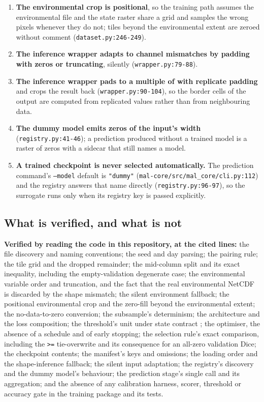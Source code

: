 \documentclass[11pt,a4paper]{article}
\newcommand{\codex}[1]{\texttt{#1}}
\newcommand{\PoolMult}{\codeconst{training.pad_multiple}}
\newcommand{\StateContract}{\mskey{contracts.cogs_state}}
\begin{document}
\begin{enumerate}
\item \textbf{The environmental crop is positional}, so the training path
      assumes the environmental file and the state raster share a grid and
      samples the wrong pixels whenever they do not; tiles beyond the
      environmental extent are zeroed without comment
      (\codex{dataset.py:246-249}).
\item \textbf{The inference wrapper adapts to channel mismatches by padding
      with zeros or truncating}, silently (\codex{wrapper.py:79-88}).
\item \textbf{The inference wrapper pads to a multiple of \PoolMult{} with
      replicate padding} and crops the result back
      (\codex{wrapper.py:90-104}), so the border cells of the output are
      computed from replicated values rather than from neighbouring data.
\item \textbf{The dummy model emits zeros of the input's width}
      (\codex{registry.py:41-46}); a prediction produced without a trained
      model is a raster of zeros with a sidecar that still names a model.
\item \textbf{A trained checkpoint is never selected automatically.} The
      prediction command's \codex{--model} default is \codex{"dummy"}
      (\codex{mal-core/src/mal\_core/cli.py:112}) and the registry answers
      that name directly (\codex{registry.py:96-97}), so the surrogate runs
      only when its registry key is passed explicitly.
\end{enumerate}

\subsection{What is verified, and what is not}

\textbf{Verified by reading the code in this repository, at the cited lines:}
the file discovery and naming conventions; the seed and day parsing; the
pairing rule; the tile grid and the dropped remainder; the mid-column split
and its exact inequality, including the empty-validation degenerate case;
the environmental variable order and truncation, and the fact that the real
environmental NetCDF is discarded by the shape mismatch; the silent
environment fallback; the positional environmental crop and the
zero-fill beyond the environmental extent; the no-data-to-zero conversion;
the
subsample's determinism; the architecture and the loss composition; the
threshold's unit under state contract \StateContract; the optimiser, the
absence of a schedule and of early stopping; the selection rule's exact
comparison, including the \codex{>=} tie-overwrite and its consequence for
an all-zero validation Dice; the checkpoint contents; the manifest's keys and
omissions; the
loading order and the shape-inference fallback; the silent input adaptation;
the registry's discovery and the dummy model's behaviour; the prediction
stage's single call and its aggregation; and the absence of any calibration
harness, scorer, threshold or accuracy gate in the training package and its
tests.
\end{document}
